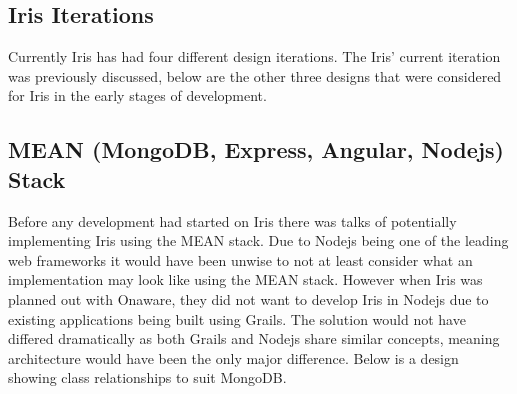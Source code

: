 \documentclass[12pt,a4paper,titlepage]{report}
\begin{document}
\begin{appendices}
\chapter{Iris Iterations}\label{sec:iterations}

Currently Iris has had four different design iterations. The Iris’ current iteration was previously discussed, below are the other three designs that were considered for Iris in the early stages of development.

\section{ MEAN (MongoDB, Express, Angular, Nodejs) Stack}

Before any development had started on Iris there was talks of potentially implementing Iris using the MEAN stack. Due to Nodejs being one of the leading web frameworks it would have been unwise to not at least consider what an implementation may look like using the MEAN stack. However when Iris was planned out with Onaware, they did not want to develop Iris in Nodejs due to existing applications being built using Grails. The solution would not have differed dramatically as both Grails and Nodejs share similar concepts, meaning architecture would have been the only major difference. Below is a design showing class relationships to suit MongoDB.


\end{appendices}
\end{document}
